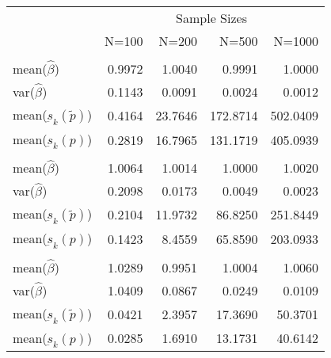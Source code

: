 
\begin{tabular}{lrrrr}
\toprule
\multicolumn{1}{c}{ } & \multicolumn{4}{c}{Sample Sizes} \\
\cmidrule(l{3pt}r{3pt}){2-5}
  & N=100 & N=200 & N=500 & N=1000\\
\midrule
\addlinespace[0.3em]
\multicolumn{5}{l}{\textbf{$ \rho = 0 $  }}\\
\hspace{1em}mean($\hat{\beta}$) & 0.9972 & 1.0040 & 0.9991 & 1.0000\\
\hspace{1em}var($\hat{\beta}$) & 0.1143 & 0.0091 & 0.0024 & 0.0012\\
\hspace{1em}mean($\underbar{s}_k(\tilde{p})$) & 0.4164 & 23.7646 & 172.8714 & 502.0409\\
\hspace{1em}mean($\underbar{s}_k(p)$) & 0.2819 & 16.7965 & 131.1719 & 405.0939\\
\addlinespace[0.3em]
\multicolumn{5}{l}{\textbf{$ \rho = 0.5 $}}\\
\hspace{1em}mean($\hat{\beta}$) & 1.0064 & 1.0014 & 1.0000 & 1.0020\\
\hspace{1em}var($\hat{\beta}$) & 0.2098 & 0.0173 & 0.0049 & 0.0023\\
\hspace{1em}mean($\underbar{s}_k(\tilde{p})$) & 0.2104 & 11.9732 & 86.8250 & 251.8449\\
\hspace{1em}mean($\underbar{s}_k(p)$) & 0.1423 & 8.4559 & 65.8590 & 203.0933\\
\addlinespace[0.3em]
\multicolumn{5}{l}{\textbf{$ \rho = 0.9 $}}\\
\hspace{1em}mean($\hat{\beta}$) & 1.0289 & 0.9951 & 1.0004 & 1.0060\\
\hspace{1em}var($\hat{\beta}$) & 1.0409 & 0.0867 & 0.0249 & 0.0109\\
\hspace{1em}mean($\underbar{s}_k(\tilde{p})$) & 0.0421 & 2.3957 & 17.3690 & 50.3701\\
\hspace{1em}mean($\underbar{s}_k(p)$) & 0.0285 & 1.6910 & 13.1731 & 40.6142\\
\bottomrule
\end{tabular}

